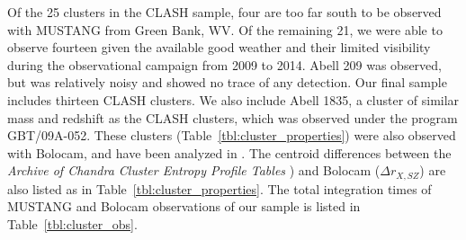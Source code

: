 \documentclass[iop,numberedappendix,apj]{emulateapj}
\begin{document}
Of the 25 clusters in the CLASH sample, four are too far south to be observed with MUSTANG from Green Bank, WV.
Of the remaining 21, we were able to observe fourteen given the available good weather and their limited visibility
during the observational campaign from 2009 to 2014.
Abell 209 was observed, but was relatively noisy and showed no trace of any detection. Our final sample
includes thirteen CLASH clusters. We also include Abell 1835, a cluster of similar mass and redshift as the CLASH
clusters, which was observed under the program GBT/09A-052. These clusters (Table~\ref{tbl:cluster_properties})
were also observed with Bolocam, and have been analyzed in \citet{sayers2012, sayers2013,czakon2015}. The centroid differences
between the \emph{Archive of Chandra Cluster Entropy Profile Tables} \citep[ACCEPT][]{cavagnolo2009}) 
and Bolocam ($\Delta r_{X,SZ}$) are also listed as  in Table~\ref{tbl:cluster_properties}. The total integration times of
MUSTANG and Bolocam observations of our sample is listed in Table~\ref{tbl:cluster_obs}. 
\end{document}
